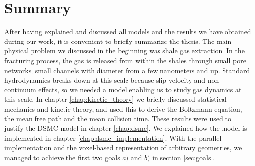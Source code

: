 \section{Summary}
After having explained and discussed all models and the results we have obtained during our work, it is convenient to briefly summarize the thesis. The main physical problem we discussed in the beginning was shale gas extraction. In the fracturing process, the gas is released from within the shales through small pore networks, small channels with diameter from a few nanometers and up. Standard hydrodynamics breaks down at this scale because slip velocity and non-continuum effects, so we needed a model enabling us to study gas dynamics at this scale. In chapter \ref{chap:kinetic_theory} we briefly discussed statistical mechanics and kinetic theory, and used this to derive the Boltzmann equation, the mean free path and the mean collision time. These results were used to justify the DSMC model in chapter \ref{chap:dsmc}. We explained how the model is implemented in chapter \ref{chap:dsmc_implementation}. With the parallel implementation and the voxel-based representation of arbitrary geometries, we managed to achieve the first two goals $a)$ and $b)$ in section \ref{sec:goals}.

